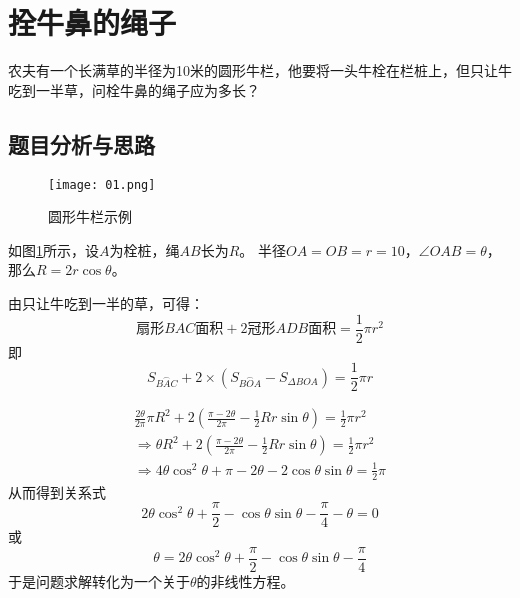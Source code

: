 \documentclass{math201}
\date{\today}
\begin{document}

\makecover


\section{拴牛鼻的绳子}

农夫有一个长满草的半径为10米的圆形牛栏，他要将一头牛栓在栏桩上，但只让牛吃到一半草，问栓牛鼻的绳子应为多长？

\subsection{题目分析与思路}

\begin{figure}[H]  
    \centering\texttt{[image: 01.png]}  
    \caption{圆形牛栏示例}     
    \label{img01}   
\end{figure}
    
如图\ref*{img01}所示，设$A$为栓桩，绳$AB$长为$R$。
半径$OA=OB=r=10$，$\angle OAB=\theta$，那么$R=2r\cos\theta$。

由只让牛吃到一半的草，可得：
\begin{equation}
    \mbox{扇形}BAC\mbox{面积} + 2\mbox{冠形}ADB\mbox{面积} = \frac{1}{2}\pi r^2
\end{equation}
即
\[
    S_{\overset{\frown}{BAC}} + 2\times(S_{\overset{\frown}{BOA}} - S_{\Delta BOA}) = \frac{1}{2}\pi r
\]

\begin{equation*}
    \begin{split}
        \frac{2\theta}{2\pi}\pi R^2 + 2(\frac{\pi - 2\theta}{2\pi} - \frac{1}{2}Rr\sin\theta) = \frac{1}{2}\pi r^2 \\
        \Rightarrow \theta R^2 + 2(\frac{\pi - 2\theta}{2\pi} - \frac{1}{2}Rr\sin\theta) = \frac{1}{2}\pi r^2 \\
        \Rightarrow 4\theta\cos^2\theta + \pi - 2\theta - 2\cos\theta\sin\theta = \frac{1}{2}\pi
    \end{split}
\end{equation*}
从而得到关系式
\begin{equation}
    2\theta\cos^2\theta + \frac{\pi}{2} - \cos\theta\sin\theta - \frac{\pi}{4} - \theta = 0 \label{equation:1}
\end{equation}
或
\begin{equation}
    \theta = 2\theta\cos^2\theta + \frac{\pi}{2} - \cos\theta\sin\theta - \frac{\pi}{4}
\end{equation}
于是问题求解转化为一个关于$\theta$的非线性方程。
\end{document}
